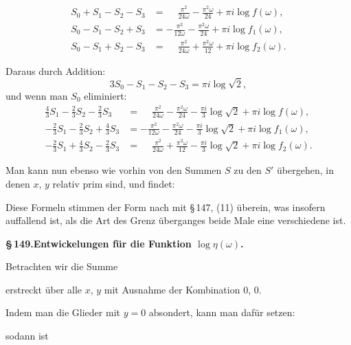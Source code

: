 
\[
\begin{aligned}
S_0+S_1-S_2-S_3&=\phantom{-}\frac{\pi^2}{24\omega}-\frac{\pi^2\omega}{24}+\pi i\log f(\omega),\\[4pt]
S_0-S_1-S_2+S_3&=-\frac{\pi^2}{12\omega}-\frac{\pi^2\omega}{24}+\pi i\log f_1(\omega),\\[4pt]
S_0-S_1+S_2-S_3&=\phantom{-}\frac{\pi^2}{24\omega}+\frac{\pi^2\omega}{12}+\pi i\log f_2(\omega).
\end{aligned}
\]

Daraus durch Addition:
\[
3S_0-S_1-S_2-S_3=\pi i\log\sqrt{2},
\]
und wenn man $S_0$ eliminiert:
\[
\begin{aligned}
\tfrac{4}{3}S_1-\tfrac{2}{3}S_2-\tfrac{2}{3}S_3&=\phantom{-}\frac{\pi^2}{24\omega}-\frac{\pi^2\omega}{24}-\frac{\pi i}{3}\log\sqrt{2}+\pi i\log f(\omega),\\[4pt]
-\tfrac{2}{3}S_1-\tfrac{2}{3}S_2+\tfrac{4}{3}S_3&=-\frac{\pi^2}{12\omega}-\frac{\pi^2\omega}{24}-\frac{\pi i}{3}\log\sqrt{2}+\pi i\log f_1(\omega),\\[4pt]
-\tfrac{2}{3}S_1+\tfrac{4}{3}S_2-\tfrac{2}{3}S_3&=\phantom{-}\frac{\pi^2}{24\omega}+\frac{\pi^2\omega}{12}-\frac{\pi i}{3}\log\sqrt{2}+\pi i\log f_2(\omega).
\end{aligned}
\]

Man kann nun ebenso wie vorhin von den Summen $S$ zu
den $S'$ übergehen, in denen $x$, $y$ relativ prim sind, und findet:


Diese Formeln stimmen der Form nach mit \S\,147, (11)
überein, was insofern auffallend ist, als die Art des Grenz\-
überganges beide Male eine verschiedene ist.

\begin{center}
\textbf{\S\,149.\quad Entwickelungen für die Funktion $\log\eta(\omega)$.}
\end{center}

Betrachten wir die Summe


erstreckt über alle $x$, $y$ mit Ausnahme der Kombination $0$, $0$.

Indem man die Glieder mit $y=0$ absondert, kann man
dafür setzen:


sodann ist
